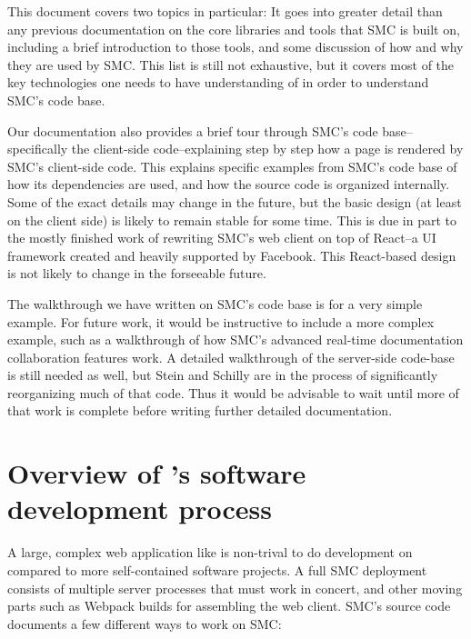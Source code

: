 \documentclass{deliverablereport}
\begin{document}
This document covers two topics in particular: It goes into greater detail than
any previous documentation on the core \JavaScript libraries and tools that SMC
is built on, including a brief introduction to those tools, and some discussion
of how and why they are used by SMC.  This list is still not exhaustive, but it
covers most of the key technologies one needs to have understanding of in order
to understand SMC's code base.

Our documentation also provides a brief tour through SMC's code base--
specifically the client-side code--explaining step by step how a page is
rendered by SMC's client-side code.  This explains specific examples from SMC's
code base of how its dependencies are used, and how the source code is
organized internally.  Some of the exact details may change in the future, but
the basic design (at least on the client side) is likely to remain stable for
some time.  This is due in part to the mostly finished work of rewriting SMC's
web client on top of React--a \JavaScript UI framework created and heavily
supported by Facebook.  This React-based design is not likely to change in the
forseeable future.

The walkthrough we have written on SMC's code base is for a very simple
example.  For future work, it would be instructive to include a more complex
example, such as a walkthrough of how SMC's advanced real-time documentation
collaboration features work.  A detailed walkthrough of the server-side
code-base is still needed as well, but Stein and Schilly are in the process of
significantly reorganizing much of that code. Thus it would be advisable to
wait until more of that work is complete before writing further detailed
documentation.


\section{Overview of \SMC's software development process}
A large, complex web application like \SMC is non-trival to do development
on compared to more self-contained software projects.  A full SMC deployment
consists of multiple server processes that must work in concert, and other
moving parts such as Webpack builds for assembling the web client.  SMC's
source code documents a few different ways to work on SMC:
\end{document}
